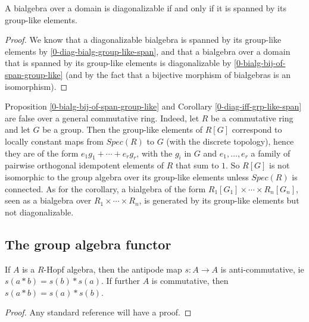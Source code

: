 \begin{corollary}
  \label{0-bialg-diag-of-span-group-like}
  \leanok

  A bialgebra over a domain is diagonalizable if and only if it is spanned by its
  group-like elements.
\end{corollary}
\begin{proof}
  \leanok

  We know that a diagonalizable bialgebra is spanned by its group-like elements
  by \ref{0-diag-bialg-group-like-span}, and that a bialgebra over a domain
  that is spanned by its group-like elements is diagonalizable by
  \ref{0-bialg-bij-of-span-group-like} (and by the fact that a bijective morphism
  of bialgebras is an isomorphism).
\end{proof}

Proposition \ref{0-bialg-bij-of-span-group-like} and Corollary
\ref{0-diag-iff-grp-like-span} are false over a general
commutative ring. Indeed, let $R$ be a commutative ring and let $G$ be a group.
Then the group-like elements of $R[G]$ correspond to locally constant maps
  from $Spec(R)$ to $G$ (with the discrete topology), hence they are of the
form $e_1 g_1+\cdots+e_r g_r$, with the $g_i$ in $G$ and $e_1,\ldots,e_r$
a family of pairwise orthogonal idempotent elements of $R$ that sum to $1$.
So $R[G]$ is not isomorphic to the group algebra over its group-like elements
unless $Spec(R)$ is connected. As for the corollary, a bialgebra of the form
$R_1[G_1]\times\cdots\times R_n[G_n]$, seen as a bialgebra over
$R_1\times\cdots\times R_n$, is generated by its group-like elements but not
diagonalizable.


\subsection{The group algebra functor}


\begin{proposition}
  \label{0-hopf-antipode-antihom}
  \uses{}
  \leanok

  If $A$ is a $R$-Hopf algebra, then the antipode map $s : A \to A$ is anti-commutative, ie $s(a * b) = s(b) * s(a)$. If further $A$ is commutative, then $s(a * b) = s(a) * s(b)$.
\end{proposition}
\begin{proof}
  \uses{}

  Any standard reference will have a proof.
\end{proof}


